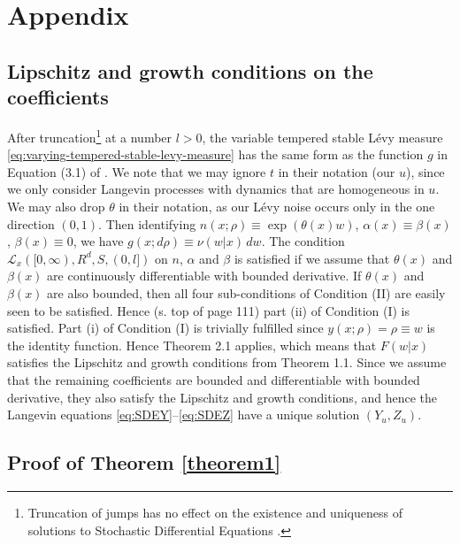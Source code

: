 \documentclass[a4paper,12pt]{elsarticle}
\numberwithin{equation}{section}
\theoremstyle{plain}
\theoremstyle{definition}
\theoremstyle{remark}
\numberwithin{equation}{section}
\newcommand{\1}{\mathbf 1}
\begin{document}


\appendix

\section{Appendix}

\subsection{Lipschitz and growth conditions on the coefficients} 
\label{subsec:Lip-gro}
After truncation\footnote{Truncation of jumps has no effect on the existence and 
uniqueness of solutions to Stochastic Differential Equations \cite{Applebaum}.} 
at a number $l > 0$, the variable tempered stable L\'evy 
measure 
\eqref{eq:varying-tempered-stable-levy-measure}
has the same form as the function $g$ in Equation (3.1) of 
\cite{Tsuchiya1992}.  
We note that we may ignore $t$ in their notation (our $u$), since we only 
consider Langevin processes with dynamics that are homogeneous in $u$.
We may also drop $\theta$ in their notation, as our L\'evy noise occurs only 
in the one direction $(0,1)$. 
Then identifying $n(x;\rho) \equiv \exp(\theta(x) w)$, 
$\alpha(x) \equiv \beta(x)$, $\beta(x) \equiv 0$, 
we have $g(x;d\rho) \equiv \nu(w|x)\,dw$. 
The condition $\mathcal L_x([0,\infty), R^d, S, (0,l])$ on $n$, $\alpha$ and 
$\beta$ is satisfied if we assume that $\theta(x)$ and $\beta(x)$ are 
continuously differentiable with bounded derivative. 
If $\theta(x)$ and $\beta(x)$ are also bounded, then all four sub-conditions of 
Condition (II) are easily seen to be satisfied.  
Hence (s. top of page 111) part (ii) of Condition (I) is satisfied. 
Part (i) of Condition (I) is trivially fulfilled since 
$y(x; \rho) = \rho \equiv w$ is the identity function. 
Hence Theorem 2.1 applies, which means that $F(w|x)$ satisfies the Lipschitz 
and growth conditions from Theorem 1.1. 
Since we assume that the remaining coefficients are bounded and differentiable 
with bounded derivative, they also satisfy the Lipschitz and growth conditions, 
and hence the Langevin equations \eqref{eq:SDEY}--\eqref{eq:SDEZ} have a unique 
solution $(Y_u, Z_u)$.


\subsection{Proof of Theorem \ref{theorem1}}
\label{sec:app-pf-th}
\end{document}
